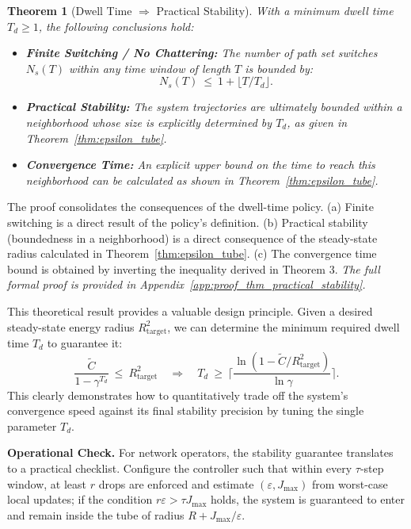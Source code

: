 \documentclass[journal]{IEEEtran}
\newtheorem{theorem}{Theorem}
\begin{document}
\begin{theorem}[Dwell Time $\Rightarrow$ Practical Stability]
\label{thm:practical_stability}
With a minimum dwell time $T_d \ge 1$, the following conclusions hold:
\begin{itemize}
    \item[\textit{(a)}] \textbf{Finite Switching / No Chattering:} The number of path set switches $N_s(T)$ within any time window of length $T$ is bounded by:
    \begin{equation}\label{eq:finite_switching}
    N_s(T)\ \le\ 1+\lfloor T/T_d \rfloor.
    \end{equation}
    \item[\textit{(b)}] \textbf{Practical Stability:} The system trajectories are ultimately bounded within a neighborhood whose size is explicitly determined by $T_d$, as given in Theorem~\ref{thm:epsilon_tube}.
    \item[\textit{(c)}] \textbf{Convergence Time:} An explicit upper bound on the time to reach this neighborhood can be calculated as shown in Theorem~\ref{thm:epsilon_tube}.
\end{itemize}
\end{theorem}
\begin{IEEEproof}
The proof consolidates the consequences of the dwell-time policy. (a) Finite switching is a direct result of the policy's definition. (b) Practical stability (boundedness in a neighborhood) is a direct consequence of the steady-state radius calculated in Theorem~\ref{thm:epsilon_tube}. (c) The convergence time bound is obtained by inverting the inequality derived in Theorem 3.
\textit{The full formal proof is provided in Appendix~\ref{app:proof_thm_practical_stability}.}
\end{IEEEproof}

This theoretical result provides a valuable design principle. Given a desired steady-state energy radius $R_{\text{target}}^2$, we can determine the minimum required dwell time $T_d$ to guarantee it:
\begin{equation}\label{eq:design_parameter_Td}
\frac{\tilde C}{1-\gamma^{T_d}}\ \le\ R_{\text{target}}^2
\quad\Longrightarrow\quad
T_d\ \ge\ \Big\lceil \frac{\ln(1-\tilde C/R_{\text{target}}^2)}{\ln \gamma}\Big\rceil.
\end{equation}
This clearly demonstrates how to quantitatively trade off the system's convergence speed against its final stability precision by tuning the single parameter $T_d$.

\textbf{Operational Check.} 
For network operators, the stability guarantee translates to a practical checklist. Configure the controller such that within every $\tau$-step window, at least $r$ drops are enforced and estimate $(\varepsilon,J_{\max})$ from worst-case local updates; if the condition $r\varepsilon > \tau J_{\max}$ holds, the system is guaranteed to enter and remain inside the tube of radius $R+J_{\max}/\varepsilon$.
\end{document}
